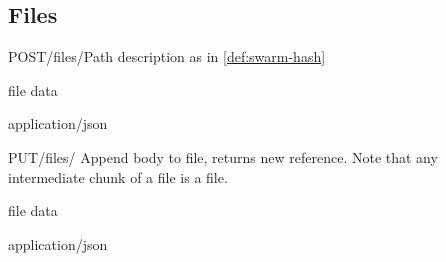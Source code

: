 \subsection{Files \statusgreen}\label{spec:api:file}

\begin{apiRoute}{POST}{/files/}{Path description as in \ref{def:swarm-hash}}
{
}
{ }

\begin{headerParameter} 
\end{headerParameter}
\begin{requestBody}
file data
\end{requestBody}
\begin{routeResponse}{application/json}


\end{routeResponse}
\end{apiRoute}






\begin{apiRoute}{PUT}{/files/ }{Append body to file, returns new reference. Note that any intermediate chunk of a file is a file.}
{
}
{ }

\begin{routeParameter} 
\end{routeParameter}
\begin{headerParameter} 
\end{headerParameter}
\begin{requestBody}
file data
\end{requestBody}
\begin{routeResponse}{application/json}
\end{routeResponse}
\end{apiRoute}



